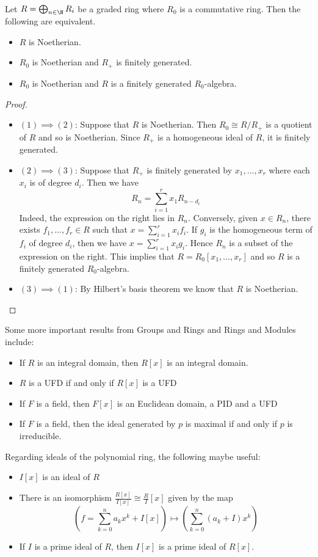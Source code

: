 \documentclass[a4paper]{article}
\begin{document}
\begin{prp}{}{}\\
Let $R=\bigoplus_{n\in\N}R_i$ be a graded ring where $R_0$ is a commutative ring. Then the following are equivalent. 
\begin{itemize}
\item $R$ is Noetherian. 
\item $R_0$ is Noetherian and $R_+$ is finitely generated. 
\item $R_0$ is Noetherian and $R$ is a finitely generated $R_0$-algebra. 
\end{itemize}
\begin{proof}
\begin{itemize}
\item $(1)\implies(2)$: Suppose that $R$ is Noetherian. Then $R_0\cong R/R_+$ is a quotient of $R$ and so is Noetherian. Since $R_+$ is a homogeneous ideal of $R$, it is finitely generated. 
\item $(2)\implies(3)$: Suppose that $R_+$ is finitely generated by $x_1,\dots,x_r$ where each $x_i$ is of degree $d_i$. Then we have $$R_n=\sum_{i=1}^r x_1R_{n-{d_i}}$$ Indeed, the expression on the right lies in $R_n$. Conversely, given $x\in R_n$, there exists $f_1,\dots,f_r\in R$ such that $x=\sum_{i=1}^rx_if_i$. If $g_i$ is the homogeneous term of $f_i$ of degree $d_i$, then we have $x=\sum_{i=1}^rx_ig_i$. Hence $R_n$ is a subset of the expression on the right. This implies that $R=R_0[x_1,\dots,x_r]$ and so $R$ is a finitely generated $R_0$-algebra. 
\item $(3)\implies(1)$: By Hilbert's basis theorem we know that $R$ is Noetherian. 
\end{itemize}
\end{proof}
\end{prp}

Some more important results from Groups and Rings and Rings and Modules include: 
\begin{itemize}
\item If $R$ is an integral domain, then $R[x]$ is an integral domain. 
\item $R$ is a UFD if and only if $R[x]$ is a UFD
\item If $F$ is a field, then $F[x]$ is an Euclidean domain, a PID and a UFD
\item If $F$ is a field, then the ideal generated by $p$ is maximal if and only if $p$ is irreducible. 
\end{itemize}

Regarding ideals of the polynomial ring, the following maybe useful: 
\begin{itemize}
\item $I[x]$ is an ideal of $R$
\item There is an isomorphism $\frac{R[x]}{I[x]}\cong\frac{R}{I}[x]$ given by the map $$\left(f=\sum_{k=0}^na_kx^k+I[x]\right)\mapsto\left(\sum_{k=0}^n(a_k+I)x^k\right)$$
\item If $I$ is a prime ideal of $R$, then $I[x]$ is a prime ideal of $R[x]$. 
\end{itemize}
\end{document}

